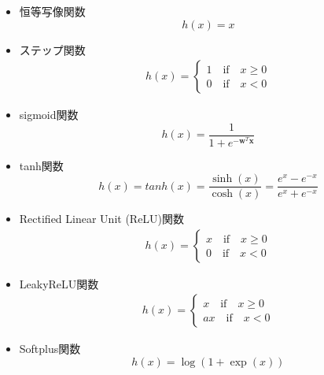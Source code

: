     \begin{itemize}
        \item 恒等写像関数
            \begin{equation}
                h(x)=x
            \end{equation}
        \item ステップ関数
            \begin{align}
              h(x)= \begin{cases}
                        1 \quad\text{if}\quad x \geq 0 \\
                        0 \quad\text{if}\quad x < 0
                    \end{cases}
            \end{align}
        \item sigmoid関数
            \begin{equation}
                h(x)=\frac{1}{1+e^{-\bm{w}^T\bm{x}}}
            \end{equation}
        \item tanh関数
            \begin{equation}
                h(x)=tanh(x)=\frac{\sinh(x)}{\cosh(x)}=\frac{e^x-e^{-x}}{e^x+e^{-x}}
            \end{equation}
        \item Rectified Linear Unit (ReLU)関数\cite{nair2010rectified}
            \begin{align}
              h(x)= \begin{cases}
                        x \quad\text{if}\quad x \geq 0 \\
                        0 \quad\text{if}\quad x < 0
                    \end{cases}
            \end{align}
        \item LeakyReLU関数\cite{maas2013rectifier}
            \begin{align}
              h(x)= \begin{cases}
                        x \quad\text{if}\quad x \geq 0 \\
                        ax \quad\text{if}\quad x < 0
                    \end{cases}
            \end{align}
        \item Softplus関数\cite{dugas2001incorporating}
            \begin{equation}
                h(x)=\log{(1+\exp(x))}
            \end{equation}

\end{itemize}

